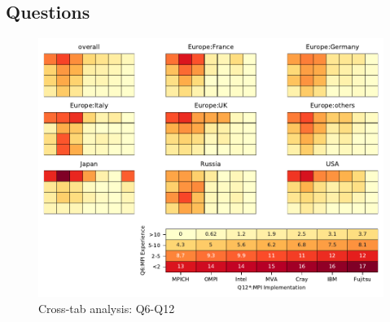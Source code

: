 
\subsection{Questions}


\begin{figure}
\begin{center}
\includegraphics[width=12cm]{../pdfs/Q6-Q12.pdf}
\caption{Cross-tab analysis: Q6-Q12}
\label{fig:Q6-Q12}
\end{center}
\end{figure}
